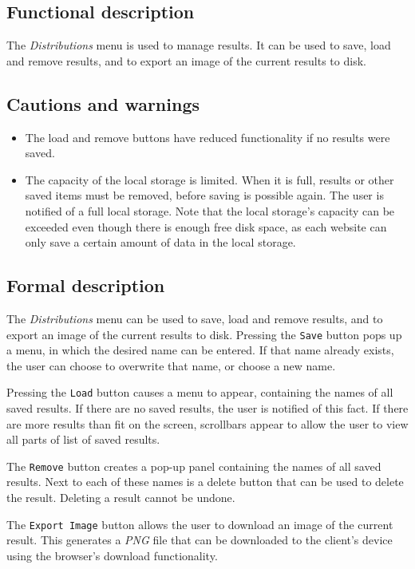   \subsection*{Functional description}
  The \emph{Distributions} menu is used to manage results. It can be used to save, load and remove results, and to export an image of the current results to disk.

  \subsection*{Cautions and warnings}
  \begin{itemize}
    \item The load and remove buttons have reduced functionality if no results were saved.
    \item The capacity of the local storage is limited. When it is full, results or other saved \projectname{} items must be removed, before saving is possible again. The user is notified of a full local storage. Note that the local storage's capacity can be exceeded even though there is enough free disk space, as each website can only save a certain amount of data in the local storage.
  \end{itemize}
  
  \subsection*{Formal description}
  The \emph{Distributions} menu can be used to save, load and remove results, and to export an image of the current results to disk. Pressing the \texttt{Save} button pops up a menu, in which the desired name can be entered. If that name already exists, the user can choose to overwrite that name, or choose a new name.
  
  Pressing the \texttt{Load} button causes a menu to appear, containing the names of all saved results. If there are no saved results, the user is notified of this fact. If there are more results than fit on the screen, scrollbars appear to allow the user to view all parts of list of saved results.
  
  The \texttt{Remove} button creates a pop-up panel containing the names of all saved results. Next to each of these names is a delete button that can be used to delete the result. Deleting a result cannot be undone. 
  
  The \texttt{Export Image} button allows the user to download an image of the current result. This generates a \emph{PNG} file that can be downloaded to the client's device using the browser's download functionality.
  
